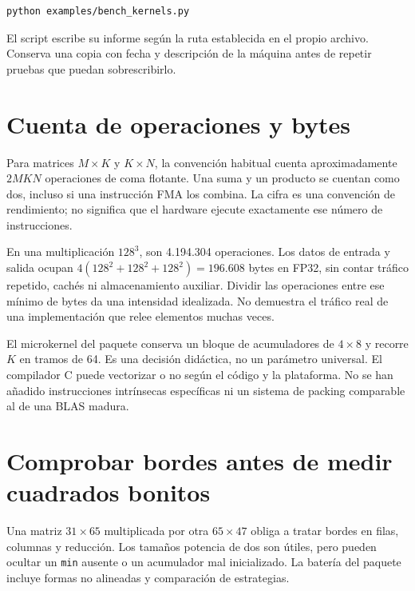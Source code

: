 \documentclass[12pt,a4paper,oneside]{report}
\begin{document}
\begin{lstlisting}[language=bash]
python examples/bench_kernels.py
\end{lstlisting}
El script escribe su informe según la ruta establecida en el propio archivo. Conserva una copia con fecha y descripción de la máquina antes de repetir pruebas que puedan sobrescribirlo.

\section{Cuenta de operaciones y bytes}
Para matrices $M\times K$ y $K\times N$, la convención habitual cuenta aproximadamente $2MKN$ operaciones de coma flotante. Una suma y un producto se cuentan como dos, incluso si una instrucción FMA los combina. La cifra es una convención de rendimiento; no significa que el hardware ejecute exactamente ese número de instrucciones.

En una multiplicación $128^3$, son 4.194.304 operaciones. Los datos de entrada y salida ocupan $4(128^2+128^2+128^2)=196.608$ bytes en FP32, sin contar tráfico repetido, cachés ni almacenamiento auxiliar. Dividir las operaciones entre ese mínimo de bytes da una intensidad idealizada. No demuestra el tráfico real de una implementación que relee elementos muchas veces.

El microkernel del paquete conserva un bloque de acumuladores de $4\times8$ y recorre $K$ en tramos de 64. Es una decisión didáctica, no un parámetro universal. El compilador C puede vectorizar o no según el código y la plataforma. No se han añadido instrucciones intrínsecas específicas ni un sistema de packing comparable al de una BLAS madura.

\section{Comprobar bordes antes de medir cuadrados bonitos}
Una matriz $31\times65$ multiplicada por otra $65\times47$ obliga a tratar bordes en filas, columnas y reducción. Los tamaños potencia de dos son útiles, pero pueden ocultar un \texttt{min} ausente o un acumulador mal inicializado. La batería del paquete incluye formas no alineadas y comparación de estrategias.
\end{document}
